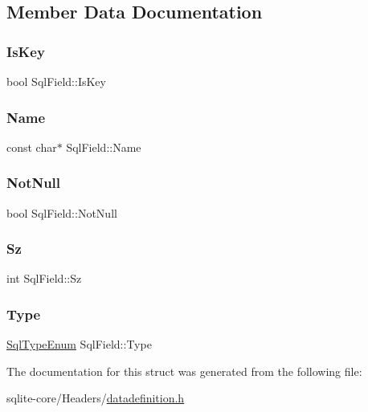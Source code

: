 \subsection{Member Data Documentation}
\mbox{\label{structSqlField_a21d13bd62ab5c18b750f050c449a0c2e}} 
\subsubsection{\texorpdfstring{Is\+Key}{IsKey}}
{\footnotesize\ttfamily bool Sql\+Field\+::\+Is\+Key}

\mbox{\label{structSqlField_ace03689493f338658646e0ac61d3a885}} 
\subsubsection{\texorpdfstring{Name}{Name}}
{\footnotesize\ttfamily const char$\ast$ Sql\+Field\+::\+Name}

\mbox{\label{structSqlField_aed207960cbeff50c17adc5a11f94b4a9}} 
\subsubsection{\texorpdfstring{Not\+Null}{NotNull}}
{\footnotesize\ttfamily bool Sql\+Field\+::\+Not\+Null}

\mbox{\label{structSqlField_aef1c65782455a79a4797ed16bf7f296b}} 
\subsubsection{\texorpdfstring{Sz}{Sz}}
{\footnotesize\ttfamily int Sql\+Field\+::\+Sz}

\mbox{\label{structSqlField_afb3221f041d06f2c792e0eef1195d0cf}} 
\subsubsection{\texorpdfstring{Type}{Type}}
{\footnotesize\ttfamily \mbox{\hyperlink{datadefinition_8h_ad06ef517a8bb3398f146f81f18988b9f}{Sql\+Type\+Enum}} Sql\+Field\+::\+Type}



The documentation for this struct was generated from the following file\+:\begin{DoxyCompactItemize}
\item 
sqlite-\/core/\+Headers/\mbox{\hyperlink{datadefinition_8h}{datadefinition.\+h}}\end{DoxyCompactItemize}
